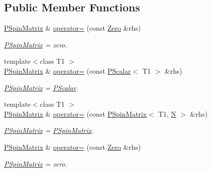 \subsection*{Public Member Functions}
\begin{DoxyCompactItemize}
\item 
\mbox{\hyperlink{classENSEM_1_1PSpinMatrix}{P\+Spin\+Matrix}} \& \mbox{\hyperlink{classENSEM_1_1PSpinMatrix_a2a776d9189f8d6fa8f9d9bc6758713c9}{operator=}} (const \mbox{\hyperlink{structENSEM_1_1Zero}{Zero}} \&rhs)
\begin{DoxyCompactList}\small\item\em \mbox{\hyperlink{classENSEM_1_1PSpinMatrix}{P\+Spin\+Matrix}} = zero. \end{DoxyCompactList}\item 
{\footnotesize template$<$class T1 $>$ }\\\mbox{\hyperlink{classENSEM_1_1PSpinMatrix}{P\+Spin\+Matrix}} \& \mbox{\hyperlink{classENSEM_1_1PSpinMatrix_a0b0ca395b4662cc2f1a18724aa8354e4}{operator=}} (const \mbox{\hyperlink{classENSEM_1_1PScalar}{P\+Scalar}}$<$ T1 $>$ \&rhs)
\begin{DoxyCompactList}\small\item\em \mbox{\hyperlink{classENSEM_1_1PSpinMatrix}{P\+Spin\+Matrix}} = \mbox{\hyperlink{classENSEM_1_1PScalar}{P\+Scalar}}. \end{DoxyCompactList}\item 
{\footnotesize template$<$class T1 $>$ }\\\mbox{\hyperlink{classENSEM_1_1PSpinMatrix}{P\+Spin\+Matrix}} \& \mbox{\hyperlink{classENSEM_1_1PSpinMatrix_a0346425dd32cab35d2f76c9d5cca8533}{operator=}} (const \mbox{\hyperlink{classENSEM_1_1PSpinMatrix}{P\+Spin\+Matrix}}$<$ T1, \mbox{\hyperlink{operator__name__util_8cc_a7722c8ecbb62d99aee7ce68b1752f337}{N}} $>$ \&rhs)
\begin{DoxyCompactList}\small\item\em \mbox{\hyperlink{classENSEM_1_1PSpinMatrix}{P\+Spin\+Matrix}} = \mbox{\hyperlink{classENSEM_1_1PSpinMatrix}{P\+Spin\+Matrix}}. \end{DoxyCompactList}\item 
\mbox{\hyperlink{classENSEM_1_1PSpinMatrix}{P\+Spin\+Matrix}} \& \mbox{\hyperlink{classENSEM_1_1PSpinMatrix_a2a776d9189f8d6fa8f9d9bc6758713c9}{operator=}} (const \mbox{\hyperlink{structENSEM_1_1Zero}{Zero}} \&rhs)
\begin{DoxyCompactList}\small\item\em \mbox{\hyperlink{classENSEM_1_1PSpinMatrix}{P\+Spin\+Matrix}} = zero. \end{DoxyCompactList}\item 

\end{DoxyCompactItemize}
